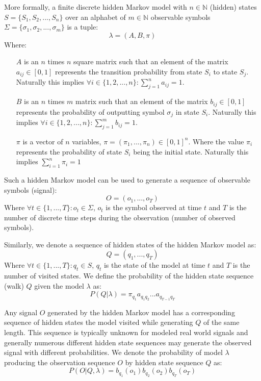 More formally, a finite discrete hidden Markov model with $n \in \mathbb{N}$ (hidden) states $S = \{S_1, S_2, ..., S_n\}$ over an alphabet of $m \in \mathbb{N}$ observable symbols $\Sigma=\{\sigma_1, \sigma_2, ..., \sigma_m\}$ is a tuple: $$\lambda = (A, B, \pi)$$
Where:
\begin{itemize}
	\item[$A$] is an $n$ times $n$ square matrix such that an element of the matrix ${a_{ij} \in [0, 1]}$ represents the transition probability from state $S_i$ to state $S_j$. Naturally this implies ${\forall i \in \{1, 2, ..., n\}: \sum_{j=1}^n{a_{ij}} = 1}$.
	\item[$B$] is an $n$ times $m$ matrix such that an element of the matrix ${b_{ij} \in [0, 1]}$ represents the probability of outputting symbol $\sigma_j$ in state $S_i$. Naturally this implies ${\forall i \in \{1, 2, ..., n\}: \sum_{j=1}^m{b_{ij}} = 1}$.
	\item[$\pi$] is a vector of $n$ variables, ${\pi=(\pi_1, ..., \pi_n) \in [0, 1]^n}$. Where the value $\pi_i$ represents the probability of state $S_i$ being the initial state. Naturally this implies ${\sum_{i=1}^n{\pi_i} = 1}$
\end{itemize}

Such a hidden Markov model can be used to generate a sequence of observable symbols (signal): $$O = (o_1, ..., o_T)$$
Where ${\forall t \in \{1, ..., T\}: o_t \in \Sigma}$, $o_t$ is the symbol observed at time $t$ and $T$ is the number of discrete time steps during the observation (number of observed symbols).

Similarly, we denote a sequence of hidden states of the hidden Markov model as: $$Q = (q_1, ..., q_T)$$
Where ${\forall t \in \{1, ..., T\}: q_t \in S}$, $q_t$ is the state of the model at time $t$ and $T$ is the number of visited states.
We define the probability of the hidden state sequence (walk) $Q$ given the model $\lambda$ as:
$$P(Q|\lambda) = \pi_{q_1}a_{q_1q_2}...a_{q_{T-1}q_T}$$

Any signal $O$ generated by the hidden Markov model has a corresponding sequence of hidden states the model visited while generating $Q$ of the same length. This sequence is typically unknown for modeled real world signals and generally numerous different hidden state sequences may generate the observed signal with different probabilities. We denote the probability of model $\lambda$ producing the observation sequence $O$ by hidden state sequence $Q$ as:
$$P(O|Q,\lambda) = b_{q_1}(o_1)b_{q_2}(o_2)b_{q_T}(o_T)$$

